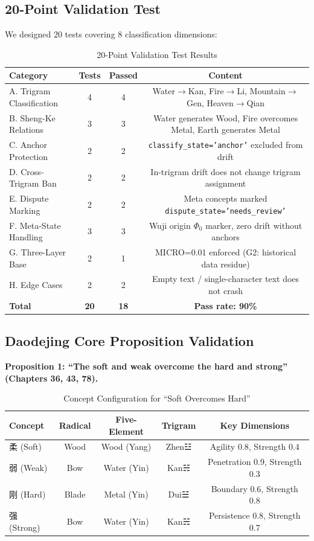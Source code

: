 \documentclass[11pt,a4paper]{article}
\begin{document}
\subsection{20-Point Validation Test}

We designed 20 tests covering 8 classification dimensions:

\begin{table}[ht]
\centering
\caption{20-Point Validation Test Results}
\begin{tabular}{lccc}
\toprule
Category & Tests & Passed & Content \\
\midrule
A. Trigram Classification & 4 & 4 & Water$\rightarrow$Kan, Fire$\rightarrow$Li, Mountain$\rightarrow$Gen, Heaven$\rightarrow$Qian \\
B. Sheng-Ke Relations   & 3 & 3 & Water generates Wood, Fire overcomes Metal, Earth generates Metal \\
C. Anchor Protection     & 2 & 2 & \texttt{classify\_state='anchor'} excluded from drift \\
D. Cross-Trigram Ban     & 2 & 2 & In-trigram drift does not change trigram assignment \\
E. Dispute Marking       & 2 & 2 & Meta concepts marked \texttt{dispute\_state='needs\_review'} \\
F. Meta-State Handling   & 3 & 3 & Wuji origin $\Phi_0$ marker, zero drift without anchors \\
G. Three-Layer Base      & 2 & 1 & MICRO=0.01 enforced (G2: historical data residue) \\
H. Edge Cases            & 2 & 2 & Empty text / single-character text does not crash \\
\midrule
\textbf{Total}           & \textbf{20} & \textbf{18} & \textbf{Pass rate: 90\%} \\
\bottomrule
\end{tabular}
\end{table}

\subsection{Daodejing Core Proposition Validation}

\textbf{Proposition 1: ``The soft and weak overcome the hard and strong'' (Chapters 36, 43, 78).}

\begin{table}[ht]
\centering
\caption{Concept Configuration for ``Soft Overcomes Hard''}
\begin{tabular}{lcccc}
\toprule
Concept & Radical & Five-Element & Trigram & Key Dimensions \\
\midrule
柔 (Soft) & Wood & Wood (Yang) & Zhen☳ & Agility 0.8, Strength 0.4 \\
弱 (Weak) & Bow  & Water (Yin) & Kan☵  & Penetration 0.9, Strength 0.3 \\
刚 (Hard) & Blade& Metal (Yin) & Dui☱  & Boundary 0.6, Strength 0.8 \\
强 (Strong)& Bow  & Water (Yin) & Kan☵  & Persistence 0.8, Strength 0.7 \\
\bottomrule
\end{tabular}
\end{table}
\end{document}
